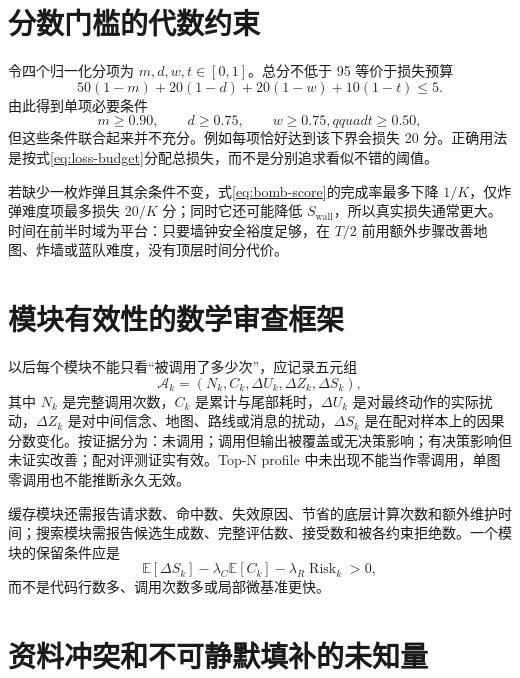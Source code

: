 \documentclass[UTF8,11pt]{ctexart}
\newcommand{\E}{\mathbb{E}}
\begin{document}
\section{分数门槛的代数约束}

令四个归一化分项为 $m,d,w,t\in[0,1]$。总分不低于 95 等价于损失预算
\begin{equation}
50(1-m)+20(1-d)+20(1-w)+10(1-t)\le5.
\label{eq:loss-budget}
\end{equation}
由此得到单项必要条件
\begin{equation}
m\ge0.90,\qquad d\ge0.75,
\qquad w\ge0.75,qquad t\ge0.50,
\end{equation}
但这些条件联合起来并不充分。例如每项恰好达到该下界会损失 20 分。正确用法是按式\eqref{eq:loss-budget}分配总损失，而不是分别追求看似不错的阈值。

若缺少一枚炸弹且其余条件不变，式\eqref{eq:bomb-score}的完成率最多下降 $1/K$，仅炸弹难度项最多损失 $20/K$ 分；同时它还可能降低 $S_{\mathrm{wall}}$，所以真实损失通常更大。时间在前半时域为平台：只要墙钟安全裕度足够，在 $T/2$ 前用额外步骤改善地图、炸墙或蓝队难度，没有顶层时间分代价。

\section{模块有效性的数学审查框架}

以后每个模块不能只看“被调用了多少次”，应记录五元组
\begin{equation}
\mathcal A_k=(N_k,C_k,\Delta U_k,\Delta Z_k,\Delta S_k),
\end{equation}
其中 $N_k$ 是完整调用次数，$C_k$ 是累计与尾部耗时，$\Delta U_k$ 是对最终动作的实际扰动，$\Delta Z_k$ 是对中间信念、地图、路线或消息的扰动，$\Delta S_k$ 是在配对样本上的因果分数变化。按证据分为：未调用；调用但输出被覆盖或无决策影响；有决策影响但未证实改善；配对评测证实有效。Top-N profile 中未出现不能当作零调用，单图零调用也不能推断永久无效。

缓存模块还需报告请求数、命中数、失效原因、节省的底层计算次数和额外维护时间；搜索模块需报告候选生成数、完整评估数、接受数和被各约束拒绝数。一个模块的保留条件应是
\begin{equation}
\E[\Delta S_k]-\lambda_C\E[C_k]-\lambda_R\operatorname{Risk}_k>0,
\end{equation}
而不是代码行数多、调用次数多或局部微基准更快。

\section{资料冲突和不可静默填补的未知量}
\end{document}
